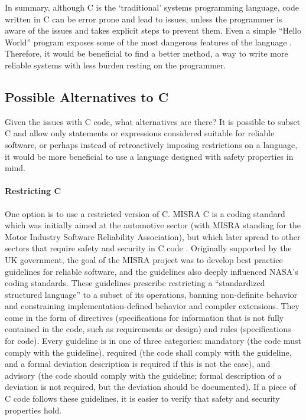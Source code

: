 In summary, although C is the `traditional' systems programming language, code written in C can be error prone and lead to issues, unless the programmer is aware of the issues and takes explicit steps to prevent them.
Even a simple ``Hello World'' program exposes some of the most dangerous features of the language \cite{milewski}.
Therefore, it would be beneficial to find a better method, a way to write more reliable systems with less burden resting on the programmer.

\subsection{Possible Alternatives to C}
Given the issues with C code, what alternatives are there?
It is possible to subset C and allow only statements or expressions considered suitable for reliable software, or perhaps instead of retroactively imposing restrictions on a language, it would be more beneficial to use a language designed with safety properties in mind.

\paragraph{Restricting C}
One option is to use a restricted version of C.
MISRA C is a coding standard which was initially aimed at the automotive sector (with MISRA standing for the Motor Industry Software Reliability Association), but which later spread to other sectors that require safety and security in C code \cite{bagnara2018}.
Originally supported by the UK government, the goal of the MISRA project was to develop best practice guidelines for reliable software, and the guidelines also deeply influenced NASA's coding standards.
These guidelines prescribe restricting a ``standardized structured language'' to a subset of its operations, banning non-definite behavior and constraining implementation-defined behavior and compiler extensions.
They come in the form of directives (specifications for information that is not fully contained in the code, such as requirements or design) and rules (specifications for code).
Every guideline is in one of three categories: mandatory (the code must comply with the guideline), required (the code shall comply with the guideline, and a formal deviation description is required if this is not the case), and advisory (the code should comply with the guideline; formal description of a deviation is not required, but the deviation should be documented).
If a piece of C code follows these guidelines, it is easier to verify that safety and security properties hold.

